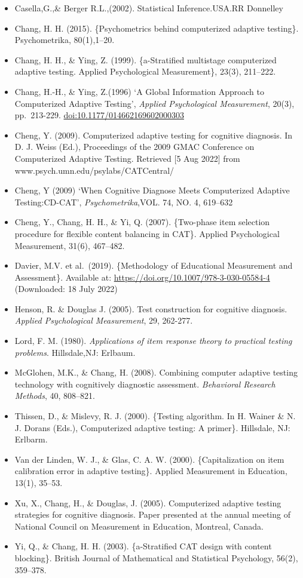 \documentclass[
]{article}
\begin{document}
\begin{itemize}
\item
  Casella,G.,\& Berger R.L.,(2002). Statistical Inference.USA.RR
  Donnelley
\item
  Chang, H. H. (2015). \{Psychometrics behind computerized adaptive
  testing\}. Psychometrika, 80(1),1--20.
\item
  Chang, H. H., \& Ying, Z. (1999). \{a-Stratified multistage
  computerized adaptive testing. Applied Psychological Measurement\},
  23(3), 211--222.
\item
  Chang, H.-H., \& Ying, Z.(1996) `A Global Information Approach to
  Computerized Adaptive Testing',
  \textit{Applied Psychological Measurement}, 20(3), pp.~213-229.
  \url{doi:10.1177/014662169602000303}
\item
  Cheng, Y. (2009). Computerized adaptive testing for cognitive
  diagnosis. In D. J. Weiss (Ed.), Proceedings of the 2009 GMAC
  Conference on Computerized Adaptive Testing. Retrieved {[}5 Aug
  2022{]} from www.psych.umn.edu/psylabs/CATCentral/
\item
  Cheng, Y (2009) `When Cognitive Diagnose Meets Computerized Adaptive
  Testing:CD-CAT', \emph{Psychometrika},VOL. 74, NO. 4, 619--632
\item
  Cheng, Y., Chang, H. H., \& Yi, Q. (2007). \{Two-phase item selection
  procedure for flexible content balancing in CAT\}. Applied
  Psychological Measurement, 31(6), 467--482.
\item
  Davier, M.V. et al.~(2019). \{Methodology of Educational Measurement
  and Assessment\}. Available at:
  \url{https://doi.org/10.1007/978-3-030-05584-4} (Downloaded: 18 July
  2022)
\item
  Henson, R. \& Douglas J. (2005). Test construction for cognitive
  diagnosis. \emph{Applied Psychological Measurement}, 29, 262-277.
\item
  Lord, F. M. (1980).
  \textit{Applications of item response theory to practical testing problems}.
  Hillsdale,NJ: Erlbaum.
\item
  McGlohen, M.K., \& Chang, H. (2008). Combining computer adaptive
  testing technology with cognitively diagnostic assessment.
  \emph{Behavioral Research Methods}, 40, 808--821.
\item
  Thissen, D., \& Mislevy, R. J. (2000). \{Testing algorithm. In H.
  Wainer \& N. J. Dorans (Eds.), Computerized adaptive testing: A
  primer\}. Hillsdale, NJ: Erlbarm.
\item
  Van der Linden, W. J., \& Glas, C. A. W. (2000). \{Capitalization on
  item calibration error in adaptive testing\}. Applied Measurement in
  Education, 13(1), 35--53.
\item
  Xu, X., Chang, H., \& Douglas, J. (2005). Computerized adaptive
  testing strategies for cognitive diagnosis. Paper presented at the
  annual meeting of National Council on Measurement in Education,
  Montreal, Canada.
\item
  Yi, Q., \& Chang, H. H. (2003). \{a-Stratified CAT design with content
  blocking\}. British Journal of Mathematical and Statistical
  Psychology, 56(2), 359--378.
\end{itemize}
\end{document}
